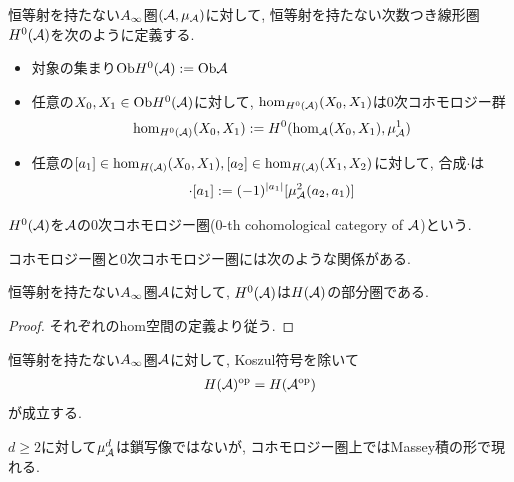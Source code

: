 \documentclass[uplatex, a4paper, 14Q, dvipdfmx]{jsarticle}
\begin{document}
\begin{definition}[$0$次コホモロジー圏]
  恒等射を持たない$A_{\infty}$圏$(\mathcal{A},\mu_{\mathcal{A}})$に対して, 恒等射を持たない次数つき線形圏$H^0(\mathcal{A})$を次のように定義する. 
  \begin{itemize}
    \item 対象の集まり$\mathrm{Ob} H^0(\mathcal{A}) := \mathrm{Ob}\mathcal{A}$
    \item 任意の$X_0, X_1 \in \mathrm{Ob} H^0(\mathcal{A})$に対して, $\hom_{H^0(\mathcal{A})}(X_0,X_1)$は$0$次コホモロジー群
    \begin{align*}
      \hom_{H^0(\mathcal{A})}(X_0,X_1) := H^0(\hom_{\mathcal{A}}(X_0,X_1), \mu^1_{\mathcal{A}})
    \end{align*}
    \item 任意の$[a_1] \in \hom_{H(\mathcal{A})}(X_0,X_1), [a_2] \in \hom_{H(\mathcal{A})}(X_1,X_2)$に対して, 合成$\cdot$は
    \begin{align*}
      [a_2] \cdot [a_1] := (-1)^{|a_1|} [\mu^2_\A(a_2,a_1)]
    \end{align*}
  \end{itemize}
  $H^0(\mathcal{A})$を$\mathcal{A}$の$0$次コホモロジー圏($0$-th cohomological category of $\mathcal{A}$)という. 
\end{definition}

コホモロジー圏と$0$次コホモロジー圏には次のような関係がある. 

\begin{lemma}
  恒等射を持たない$A_{\infty}$圏$\mathcal{A}$に対して, $H^0(\mathcal{A})$は$H(\mathcal{A})$の部分圏である.
\end{lemma}

\begin{proof}
  それぞれのhom空間の定義より従う. 
\end{proof}

\begin{lemma}
  恒等射を持たない$A_{\infty}$圏$\mathcal{A}$に対して, Koszul符号を除いて
  \begin{align*}
    H(\mathcal{A})^{\mathrm{op}} = H(\mathcal{A}^\mathrm{op})
  \end{align*}
  が成立する. 
\end{lemma}

$d \geq 2$に対して$\mu^d_{\mathcal{A}}$は鎖写像ではないが, コホモロジー圏上ではMassey積の形で現れる. 
\end{document}

